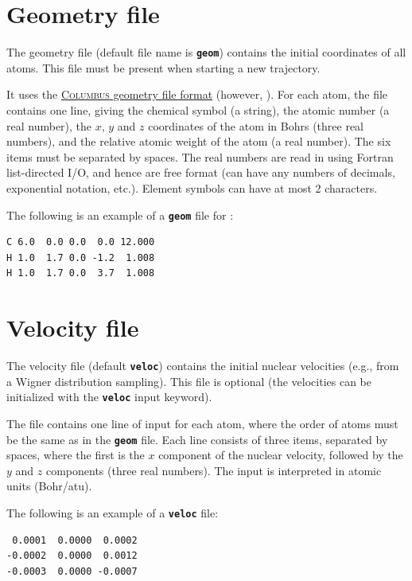 \documentclass[a4paper,11pt,DIV=15,openany,twoside=false]{scrbook}
\newcommand{\todo}[1]{\textcolor{RL}{#1}}
\newcommand{\ttt}[1]{\textbf{\texttt{#1}}}
\newenvironment{example}{
  \vspace{0mm}
  \definecolor{shadecolor}{HTML}{BBDDFF}
  \begin{shaded}
  \begin{minipage}{0.9\textwidth}
}{
  \end{minipage}
  \end{shaded}
}
\begin{document}
\section{Geometry file}\label{sec:geomfile}

The geometry file (default file name is \ttt{geom}) contains the initial coordinates of all atoms. This file must be present when starting a new trajectory.

It uses the \href{http://www.univie.ac.at/columbus/docs_COL70/documentation_main.html}{\textsc{Columbus} geometry file format} (however, \todo{}). For each atom, the file contains one line, giving the chemical symbol (a string), the atomic number (a real number), the $x$, $y$ and $z$ coordinates of the atom in Bohrs (three real numbers), and the relative atomic weight of the atom (a real number). The six items must be separated by spaces. The real numbers are read in using Fortran list-directed I/O, and hence are free format (can have any numbers of decimals, exponential notation, etc.). Element symbols can have at most 2 characters.

The following is an example of a \ttt{geom} file for :
\begin{example}
  \begin{verbatim}
C 6.0  0.0 0.0  0.0 12.000
H 1.0  1.7 0.0 -1.2  1.008
H 1.0  1.7 0.0  3.7  1.008
  \end{verbatim}
\end{example}

\section{Velocity file}\label{sec:velocfile}

The velocity file (default \ttt{veloc}) contains the initial nuclear velocities (e.g., from a Wigner distribution sampling). This file is optional (the velocities can be initialized with the \ttt{veloc} input keyword). 

The file contains one line of input for each atom, where the order of atoms must be the same as in the \ttt{geom} file. Each line consists of three items, separated by spaces, where the first is the $x$ component of the nuclear velocity, followed by the $y$ and $z$ components (three real numbers). The input is interpreted in atomic units (Bohr/atu).

The following is an example of a \ttt{veloc} file:
\begin{example}
  \begin{verbatim}
 0.0001  0.0000  0.0002
-0.0002  0.0000  0.0012
-0.0003  0.0000 -0.0007
  \end{verbatim}
\end{example}
\end{document}
